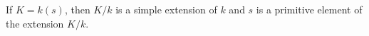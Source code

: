 If $K = k(s)$, then $K/k$ is a simple extension of $k$ and $s$ is a primitive element of the extension $K/k$.
